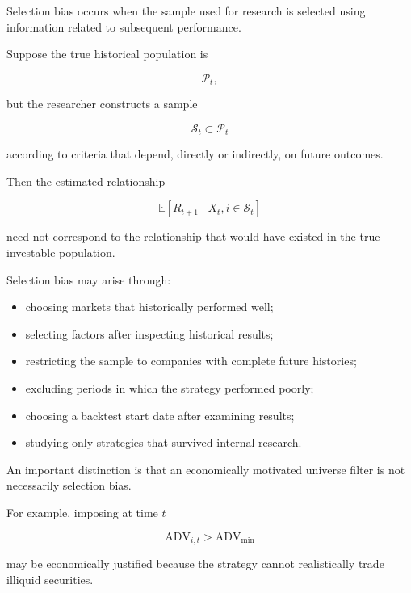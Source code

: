 \documentclass[11pt,a4paper]{article}
\begin{document}
Selection bias occurs when the sample used for research is selected using
information related to subsequent performance.

Suppose the true historical population is

\begin{equation}
\mathcal{P}_t,
\end{equation}

but the researcher constructs a sample

\begin{equation}
\mathcal{S}_t
\subset
\mathcal{P}_t
\end{equation}

according to criteria that depend, directly or indirectly, on future outcomes.

Then the estimated relationship

\begin{equation}
\mathbb{E}
\left[
R_{t+1}
\mid
X_t,
i\in\mathcal{S}_t
\right]
\end{equation}

need not correspond to the relationship that would have existed in the true
investable population.

Selection bias may arise through:

\begin{itemize}
    \item choosing markets that historically performed well;
    \item selecting factors after inspecting historical results;
    \item restricting the sample to companies with complete future histories;
    \item excluding periods in which the strategy performed poorly;
    \item choosing a backtest start date after examining results;
    \item studying only strategies that survived internal research.
\end{itemize}

An important distinction is that an economically motivated universe filter is
not necessarily selection bias.

For example, imposing at time $t$

\begin{equation}
\mathrm{ADV}_{i,t}
>
\mathrm{ADV}_{\min}
\end{equation}

may be economically justified because the strategy cannot realistically trade
illiquid securities.
\end{document}

